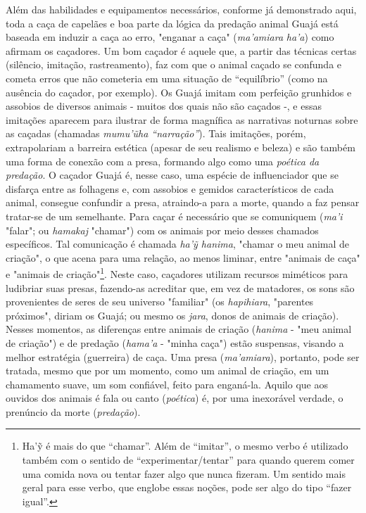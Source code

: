 Além das habilidades e equipamentos necessários, conforme já demonstrado
aqui, toda a caça de capelães e boa parte da lógica da predação animal
Guajá está baseada em induzir a caça ao erro, "enganar a caça"
(\emph{ma'amiara} \emph{ha'a}) como afirmam os caçadores. Um bom caçador
é aquele que, a partir das técnicas certas (silêncio, imitação,
rastreamento), faz com que o animal caçado se confunda e cometa erros
que não cometeria em uma situação de ``equilíbrio'' (como na ausência do
caçador, por exemplo). Os Guajá imitam com perfeição grunhidos e
assobios de diversos animais - muitos dos quais não são caçados -, e
essas imitações aparecem para ilustrar de forma magnífica as narrativas
noturnas sobre as caçadas (chamadas \emph{mumu'ũha ``narração''}). Tais
imitações, porém, extrapolariam a barreira estética (apesar de seu
realismo e beleza) e são também uma forma de conexão com a presa,
formando algo como uma \emph{poética da predação}. O caçador Guajá é,
nesse caso, uma espécie de influenciador que se disfarça entre as
folhagens e, com assobios e gemidos característicos de cada animal,
consegue confundir a presa, atraindo-a para a morte, quando a faz pensar
tratar-se de um semelhante. Para caçar é necessário que se comuniquem
(\emph{ma'i} "falar"; ou \emph{hamakaj} "chamar") com os animais por
meio desses chamados específicos. Tal comunicação é chamada \emph{ha'ỹ
hanima}, "chamar o meu animal de criação", o que acena para uma relação,
ao menos liminar, entre "animais de caça" e "animais de
criação"\footnote{Ha'ỹ é mais do que ``chamar''. Além de ``imitar'', o
  mesmo verbo é utilizado também com o sentido de
  ``experimentar/tentar'' para quando querem comer uma comida nova ou
  tentar fazer algo que nunca fizeram. Um sentido mais geral para esse
  verbo, que englobe essas noções, pode ser algo do tipo ``fazer
  igual''.}. Neste caso, caçadores utilizam recursos miméticos para
ludibriar suas presas, fazendo-as acreditar que, em vez de matadores, os
sons são provenientes de seres de seu universo "familiar" (os
\emph{hapihiara}, "parentes próximos", diriam os Guajá; ou mesmo os
\emph{jara}, donos de animais de criação). Nesses momentos, as
diferenças entre animais de criação (\emph{hanima} - "meu animal de
criação") e de predação (\emph{hama'a} - "minha caça") estão suspensas,
visando a melhor estratégia (guerreira) de caça. Uma presa
(\emph{ma'amiara}), portanto, pode ser tratada, mesmo que por um
momento, como um animal de criação, em um chamamento suave, um som
confiável, feito para enganá-la. Aquilo que aos ouvidos dos animais é
fala ou canto (\emph{poética}) é, por uma inexorável verdade, o
prenúncio da morte (\emph{predação}).

